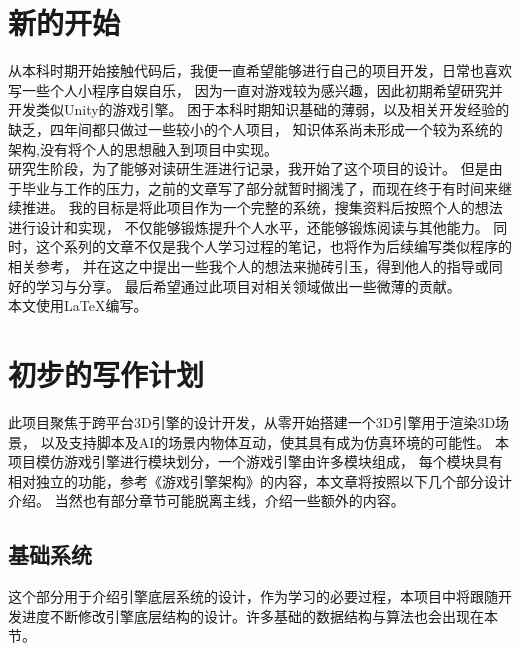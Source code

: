 \section{新的开始}

从本科时期开始接触代码后，我便一直希望能够进行自己的项目开发，日常也喜欢写一些个人小程序自娱自乐，
因为一直对游戏较为感兴趣，因此初期希望研究并开发类似Unity的游戏引擎。
困于本科时期知识基础的薄弱，以及相关开发经验的缺乏，四年间都只做过一些较小的个人项目，
知识体系尚未形成一个较为系统的架构,没有将个人的思想融入到项目中实现。\\

研究生阶段，为了能够对读研生涯进行记录，我开始了这个项目的设计。
但是由于毕业与工作的压力，之前的文章写了部分就暂时搁浅了，而现在终于有时间来继续推进。
我的目标是将此项目作为一个完整的系统，搜集资料后按照个人的想法进行设计和实现，
不仅能够锻炼提升个人水平，还能够锻炼阅读与其他能力。
同时，这个系列的文章不仅是我个人学习过程的笔记，也将作为后续编写类似程序的相关参考，
并在这之中提出一些我个人的想法来抛砖引玉，得到他人的指导或同好的学习与分享。
最后希望通过此项目对相关领域做出一些微薄的贡献。\\

本文使用\LaTeX{}编写。

\maketitle
\section{初步的写作计划}

此项目聚焦于跨平台3D引擎的设计开发，从零开始搭建一个3D引擎用于渲染3D场景，
以及支持脚本及AI的场景内物体互动，使其具有成为仿真环境的可能性。
本项目模仿游戏引擎进行模块划分，一个游戏引擎由许多模块组成，
每个模块具有相对独立的功能，参考《游戏引擎架构》的内容，本文章将按照以下几个部分设计介绍。
当然也有部分章节可能脱离主线，介绍一些额外的内容。

\maketitle
\subsection{基础系统}

这个部分用于介绍引擎底层系统的设计，作为学习的必要过程，本项目中将跟随开发进度不断修改引擎底层结构的设计。许多基础的数据结构与算法也会出现在本节。

